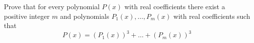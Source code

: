 Prove that for every polynomial $P(x)$ with real coefficients there exist a positive integer $m$ and polynomials $P_{1}(x),\ldots , P_{m}(x)$ with real coefficients such that\[P(x) = (P_{1}(x))^{3}+\ldots +(P_{m}(x))^{3}\]